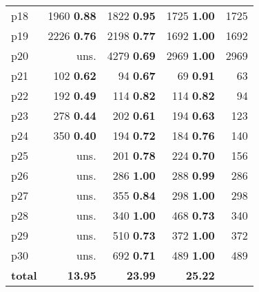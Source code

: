 \begin{tabular}{|l|rrr|r|}
p18 & {\footnotesize 1960} \textbf{0.88} & {\footnotesize 1822} \textbf{0.95} & {\footnotesize 1725} \textbf{1.00} & 1725\\
p19 & {\footnotesize 2226} \textbf{0.76} & {\footnotesize 2198} \textbf{0.77} & {\footnotesize 1692} \textbf{1.00} & 1692\\
p20 & uns. & {\footnotesize 4279} \textbf{0.69} & {\footnotesize 2969} \textbf{1.00} & 2969\\
p21 & {\footnotesize 102} \textbf{0.62} & {\footnotesize 94} \textbf{0.67} & {\footnotesize 69} \textbf{0.91} & 63\\
p22 & {\footnotesize 192} \textbf{0.49} & {\footnotesize 114} \textbf{0.82} & {\footnotesize 114} \textbf{0.82} & 94\\
p23 & {\footnotesize 278} \textbf{0.44} & {\footnotesize 202} \textbf{0.61} & {\footnotesize 194} \textbf{0.63} & 123\\
p24 & {\footnotesize 350} \textbf{0.40} & {\footnotesize 194} \textbf{0.72} & {\footnotesize 184} \textbf{0.76} & 140\\
p25 & uns. & {\footnotesize 201} \textbf{0.78} & {\footnotesize 224} \textbf{0.70} & 156\\
p26 & uns. & {\footnotesize 286} \textbf{1.00} & {\footnotesize 288} \textbf{0.99} & 286\\
p27 & uns. & {\footnotesize 355} \textbf{0.84} & {\footnotesize 298} \textbf{1.00} & 298\\
p28 & uns. & {\footnotesize 340} \textbf{1.00} & {\footnotesize 468} \textbf{0.73} & 340\\
p29 & uns. & {\footnotesize 510} \textbf{0.73} & {\footnotesize 372} \textbf{1.00} & 372\\
p30 & uns. & {\footnotesize 692} \textbf{0.71} & {\footnotesize 489} \textbf{1.00} & 489\\
\hline
\textbf{total} & \textbf{13.95} & \textbf{23.99} & \textbf{25.22} & \\
\hline
\end{tabular}

